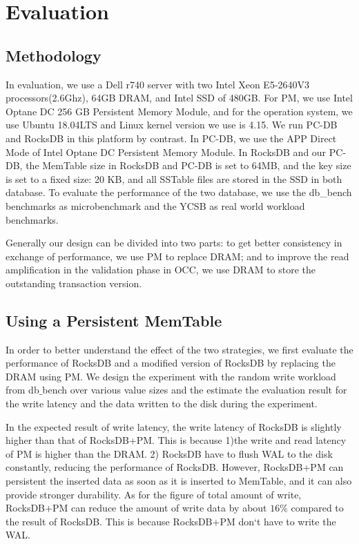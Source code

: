 \section{Evaluation}
\subsection{Methodology}
In evaluation, we use a Dell r740 server with two Intel Xeon E5-2640V3 processors(2.6Ghz), 64GB DRAM, and Intel SSD of 480GB. For PM, we use Intel Optane DC 256 GB Persistent Memory Module, and for the operation system, we use Ubuntu 18.04LTS and Linux kernel version we use is 4.15.
We run PC-DB and RocksDB in this platform by contrast. In PC-DB, we use the APP Direct Mode of Intel Optane DC Persistent Memory Module. In RocksDB and our PC-DB, the MemTable size in RocksDB and PC-DB is set to 64MB, and the key size is set to a fixed size: 20 KB, and all SSTable files are stored in the SSD in both database. 
To evaluate the performance of the two database, we use the db\_bench benchmarks as microbenchmark and the YCSB as real world workload benchmarks.  

Generally our design can be divided into two parts: to get better consistency in exchange of performance, we use PM to replace DRAM; and to improve the read amplification in the validation phase in OCC, we use DRAM to store the outstanding transaction version. 
\subsection{Using a Persistent MemTable}
In order to better understand the effect of the two strategies, we first evaluate the performance of RocksDB and a modified version of RocksDB by replacing the DRAM using PM.  We design the experiment with the random write workload from db$\_$bench over various value sizes and the estimate the evaluation result for the write latency and the data written to the disk during the experiment. 

In the expected result of write latency, the write latency of RocksDB is slightly higher than that of RocksDB+PM. This is because 1)the write and read latency of PM is higher than the DRAM. 2) RocksDB have to flush WAL to the disk constantly, reducing the performance of RocksDB. However, RocksDB+PM can persistent the inserted data as soon as it is inserted to MemTable, and it can also provide stronger durability. As for the figure of total amount of write, RocksDB+PM can reduce the amount of write data by about $16\%$ compared to the result of RocksDB. This is because RocksDB+PM don`t have to write the WAL. 

